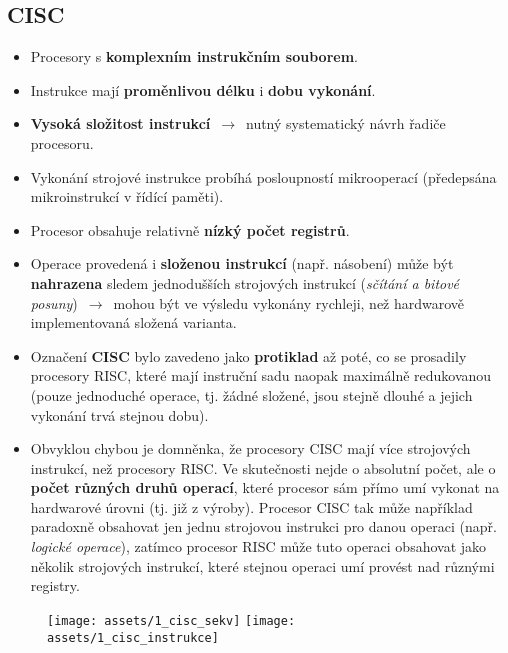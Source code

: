 \subsection{CISC}
\begin{itemize}
    \item Procesory s \textbf{komplexním instrukčním souborem}.
    \item Instrukce mají \textbf{proměnlivou délku} i \textbf{dobu vykonání}.
    \item \textbf{Vysoká složitost instrukcí} $\,\to\,$ nutný systematický návrh řadiče procesoru.
    \item Vykonání strojové instrukce probíhá posloupností mikrooperací (předepsána mikroinstrukcí v řídící paměti).
    \item Procesor obsahuje relativně \textbf{nízký počet registrů}.
    \item Operace provedená i \textbf{složenou instrukcí} (např. násobení) může být \textbf{nahrazena} sledem jednodušších strojových instrukcí (\textit{sčítání a bitové posuny}) $\,\to\,$ mohou být ve výsledu vykonány rychleji, než hardwarově implementovaná složená varianta.
    \item {Označení \textbf{CISC} bylo zavedeno jako \textbf{protiklad} až poté, co se prosadily procesory RISC, které mají instruční sadu naopak maximálně redukovanou (pouze jednoduché operace, tj. žádné složené, jsou stejně dlouhé a jejich vykonání trvá stejnou dobu).}
    \item {Obvyklou chybou je domněnka, že procesory CISC mají více strojových instrukcí, než procesory RISC. Ve skutečnosti nejde o absolutní počet, ale o \textbf{počet různých druhů operací}, které procesor sám přímo umí vykonat na hardwarové úrovni (tj. již z výroby). Procesor CISC tak může například paradoxně obsahovat jen jednu strojovou instrukci pro danou operaci (např. \textit{logické operace}), zatímco procesor RISC může tuto operaci obsahovat jako několik strojových instrukcí, které stejnou operaci umí provést nad různými registry.}
\end{itemize}
\begin{figure}[H]
    \centering
    \texttt{[image: assets/1\_cisc\_sekv]}
    \texttt{[image: assets/1\_cisc\_instrukce]}
\end{figure}


